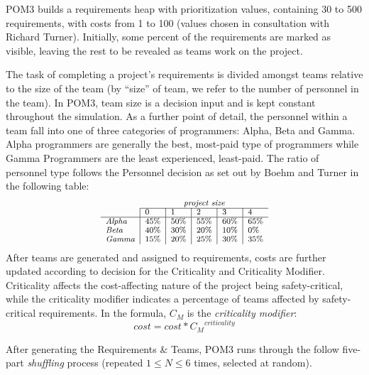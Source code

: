 \documentclass[10pt,journal,compsoc]{IEEEtran}
\begin{document}
   POM3 builds a requirements heap with prioritization values,
    containing
     30 to 500 requirements, with costs from 1 to 100 (values 
     chosen in consultation with Richard Turner).  Initially,
    some percent of the requirements are marked
    as visible, leaving the rest to be revealed as teams work on the
    project.

The task of completing a project's requirements is divided amongst teams
    relative to the size of the team (by ``size'' of team, we refer to
    the number of personnel in the team).  In POM3, team size is a decision
    input and is kept constant throughout the simulation.  As a further
    point of detail, the personnel within a team fall into one of three
    categories of programmers: Alpha, Beta and Gamma.  Alpha programmers
    are generally the best, most-paid type of programmers while Gamma
    Programmers are the least experienced, least-paid.  The ratio of personnel type
    follows the Personnel decision as set out by Boehm and Turner\cite{1204376} in the following table:    
    \[\scriptsize
    \begin{array}{l|l|l|l|l|l}
             \multicolumn{1}{c}{~}   & \multicolumn{5}{c}{\textit{project size}}\\\cline{2-6}
                & 0    & 1    & 2    & 3    & 4    \\ \hline
            \textit{Alpha} & 45\% & 50\% & 55\% & 60\% & 65\% \\ 
            \textit{Beta}  & 40\% & 30\% & 20\% & 10\% & 0\%  \\ 
            \textit{Gamma} & 15\% & 20\% & 25\% & 30\% & 35\% \\ 
        \end{array}
    \]
    After teams are generated and assigned to requirements, costs are
    further updated according to decision for the Criticality and
    Criticality Modifier.  Criticality affects the
    cost-affecting nature of the project being safety-critical, while the
    criticality modifier indicates a percentage of teams affected by
    safety-critical requirements.  In the formula, $C_M$ is the {\em criticality
    modifier}:
    \begin{equation}\label{eq:cmcrit}
    \textit{cost} = \textit{cost} * {C_M}^{\textit{criticality}}
    \end{equation}
    
After generating the
    Requirements \& Teams, POM3 runs through the follow five-part {\em shuffling} 
    process (repeated   \mbox{$1 \le N \le 6$} times, selected
    at random).
    
\end{document}
